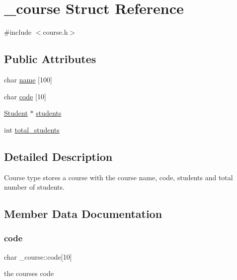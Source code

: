 \hypertarget{struct__course}{}\section{\+\_\+course Struct Reference}
\label{struct__course}


{\ttfamily \#include $<$course.\+h$>$}

\subsection*{Public Attributes}
\begin{DoxyCompactItemize}
\item 
char \mbox{\hyperlink{struct__course_a8a6f7d2171f18b5d13e86913345f381d}{name}} \mbox{[}100\mbox{]}
\item 
char \mbox{\hyperlink{struct__course_ae86dc46bc4dfe126555e5560860b583f}{code}} \mbox{[}10\mbox{]}
\item 
\mbox{\hyperlink{student_8h_abcfb362c0eb3182c835992cf3d0c0dd3}{Student}} $\ast$ \mbox{\hyperlink{struct__course_a5cf448bc80f0f8c5f23402db23d41a00}{students}}
\item 
int \mbox{\hyperlink{struct__course_afd5e161f7cf358c13cc8aa868b462006}{total\+\_\+students}}
\end{DoxyCompactItemize}


\subsection{Detailed Description}
Course type stores a course with the course name, code, students and total number of students. 

\subsection{Member Data Documentation}
\mbox{\label{struct__course_ae86dc46bc4dfe126555e5560860b583f}} 
\subsubsection{\texorpdfstring{code}{code}}
{\footnotesize\ttfamily char \+\_\+course\+::code\mbox{[}10\mbox{]}}

the course\textquotesingle{}s code \mbox{\label{struct__course_a8a6f7d2171f18b5d13e86913345f381d}} 
